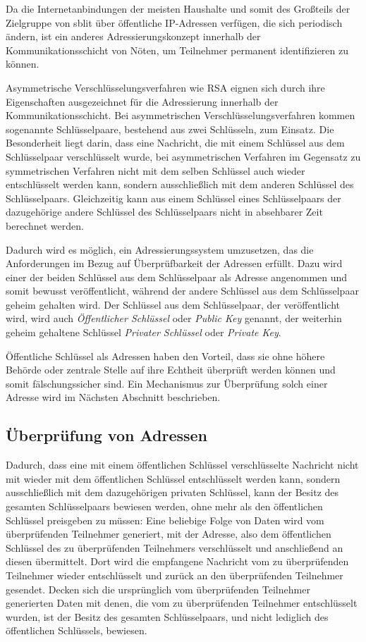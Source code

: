 
Da die Internetanbindungen der meisten Haushalte und somit des Großteils der Zielgruppe von sblit über
öffentliche IP-Adressen verfügen, die sich periodisch ändern, ist ein anderes Adressierungskonzept
innerhalb der Kommunikationsschicht von Nöten, um Teilnehmer permanent identifizieren zu können. %

Asymmetrische Verschlüsselungsverfahren wie RSA eignen sich durch ihre Eigenschaften ausgezeichnet für
die Adressierung innerhalb der Kommunikationsschicht.
Bei asymmetrischen Verschlüsselungsverfahren kommen sogenannte Schlüsselpaare, bestehend aus zwei
Schlüsseln, zum Einsatz. Die Besonderheit liegt darin, dass eine Nachricht, die mit einem Schlüssel
aus dem Schlüsselpaar verschlüsselt wurde, bei asymmetrischen Verfahren im Gegensatz zu symmetrischen
Verfahren nicht mit dem selben Schlüssel auch wieder entschlüsselt werden kann, sondern ausschließlich
mit dem anderen Schlüssel des Schlüsselpaars.
Gleichzeitig kann aus einem Schlüssel eines Schlüsselpaars der dazugehörige andere Schlüssel des
Schlüsselpaars nicht in absehbarer Zeit berechnet werden.

Dadurch wird es möglich, ein Adressierungssystem umzusetzen, das die Anforderungen im Bezug auf
Überprüfbarkeit der Adressen erfüllt. Dazu wird einer der beiden Schlüssel aus dem Schlüsselpaar
als Adresse angenommen und somit bewusst veröffentlicht, während der andere Schlüssel aus dem
Schlüsselpaar geheim gehalten wird.
Der Schlüssel aus dem Schlüsselpaar, der veröffentlicht wird, wird auch \emph{Öffentlicher Schlüssel}
oder \emph{Public Key} genannt, der weiterhin geheim gehaltene Schlüssel \emph{Privater Schlüssel} oder
\emph{Private Key}.

Öffentliche Schlüssel als Adressen haben den Vorteil, dass sie ohne höhere Behörde oder zentrale Stelle
auf ihre Echtheit überprüft werden können und somit fälschungssicher sind. Ein Mechanismus zur
Überprüfung solch einer Adresse wird im Nächsten Abschnitt beschrieben.

\subsection{Überprüfung von Adressen}
Dadurch, dass eine mit einem öffentlichen Schlüssel verschlüsselte Nachricht nicht mit wieder mit dem
öffentlichen Schlüssel entschlüsselt werden kann, sondern ausschließlich mit dem dazugehörigen privaten
Schlüssel, kann der Besitz des gesamten Schlüsselpaars bewiesen werden, ohne mehr als den öffentlichen
Schlüssel preisgeben zu müssen: Eine beliebige Folge von Daten wird vom überprüfenden Teilnehmer
generiert, mit der Adresse, also dem öffentlichen Schlüssel des zu überprüfenden Teilnehmers
verschlüsselt und anschließend an diesen übermittelt. Dort wird die empfangene Nachricht vom zu
überprüfenden Teilnehmer wieder entschlüsselt und zurück an den überprüfenden Teilnehmer gesendet.
Decken sich die ursprünglich vom überprüfenden Teilnehmer generierten Daten mit denen, die vom zu
überprüfenden Teilnehmer entschlüsselt wurden, ist der Besitz des gesamten Schlüsselpaars, und nicht
lediglich des öffentlichen Schlüssels, bewiesen.

